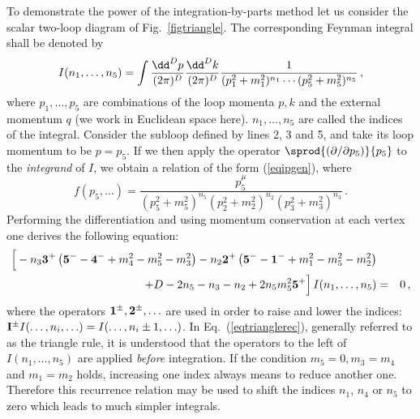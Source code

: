 To demonstrate the power of the integration-by-parts method let us
consider the scalar two-loop diagram of Fig.~\ref{figtriangle}.
The corresponding Feynman integral shall be denoted by
\begin{equation}
I(n_1,\ldots,n_5) = \int{\dd^D p\over (2\pi)^D}{\dd^D k\over (2\pi)^D}
{1\over (p_1^2 + m_1^2)^{n_1}\cdots(p_5^2+m_5^2)^{n_5}}\,,
\end{equation}
where $p_1,\ldots,p_5$ are combinations of the loop momenta $p,k$ and
the external momentum $q$ (we work in Euclidean space here).
$n_1,\ldots,n_5$ are called the indices of the integral.  Consider the
subloop defined by lines 2, 3 and 5, and take its loop momentum to be
$p=p_5$. If we then apply the operator $\sprod{(\partial/\partial
  p_5)}{p_5}$ to the {\it integrand} of $I$, we obtain a relation of the
form (\ref{eqipgen}), where
\begin{equation}
f(p_5,\ldots) = \frac{p_5^{\mu}}
  {(p_5^2+m_5^2)^{n_5} (p_2^2+m_2^2)^{n_2} (p_3^2+m_3^2)^{n_3}}
\,.
\end{equation}
Performing the differentiation and using momentum conservation at each
vertex one derives the following equation:
\begin{eqnarray}
\Big[ 
    - n_3 {\bf 3^+}\left({\bf 5^-}-{\bf 4^-}+m_4^2-m_5^2-m_3^2\right)
    - n_2 {\bf 2^+}\left({\bf 5^-}-{\bf 1^-}+m_1^2-m_5^2-m_2^2\right)
\nonumber\\
    + D-2n_5-n_3-n_2+2n_5 m_5^2 {\bf 5^+} 
\Big]\, I(n_1,\ldots,n_5) &=& 0
\,,
\label{eqtrianglerec}
\end{eqnarray}
where the operators ${\bf 1^{\pm}}, {\bf 2^{\pm}}, \ldots$ are used in
order to raise and lower the indices: ${\bf I^{\pm}}I(\ldots,n_i,\ldots)
= I(\ldots,n_i\pm 1,\ldots)$.  In Eq.~(\ref{eqtrianglerec}), generally
referred to as the triangle rule, it is understood that the operators to
the left of $I(n_1,\ldots,n_5)$ are applied {\em before} integration.  If the
condition $m_5=0, m_3=m_4$ and $m_1=m_2$ holds, increasing one index
always means to reduce another one.  Therefore this recurrence relation
may be used to shift the indices $n_1$, $n_4$ or $n_5$ to zero which leads
to much simpler integrals.

